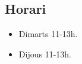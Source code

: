 \documentclass[../main.tex]{subfiles}
\begin{document}
\subsection*{Horari}
\begin{itemize}
    \item Dimarts 11-13h.
    \item Dijous 11-13h.
\end{itemize}
\end{document}
